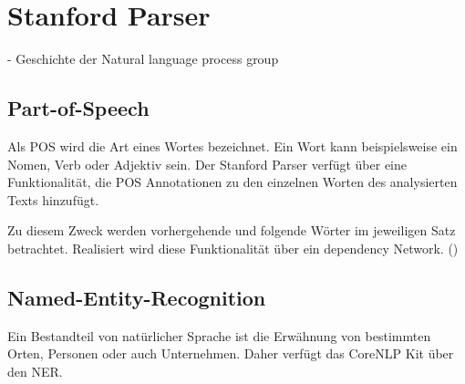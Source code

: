 \section{Stanford Parser}
- Geschichte der Natural language process group

\subsection{Part-of-Speech}
Als \ac{POS} wird die Art eines Wortes bezeichnet. Ein Wort kann beispielsweise ein Nomen, Verb oder Adjektiv sein. Der Stanford Parser verfügt über eine Funktionalität, die \ac{POS} Annotationen zu den einzelnen Worten des analysierten Texts hinzufügt.\par
Zu diesem Zweck werden vorhergehende und folgende Wörter im jeweiligen Satz betrachtet. Realisiert wird diese Funktionalität über ein dependency Network. (\cite[vgl.][1]{POSTAGGER})
\subsection{Named-Entity-Recognition}
Ein Bestandteil von natürlicher Sprache ist die Erwähnung von bestimmten Orten, Personen oder auch Unternehmen. Daher verfügt das CoreNLP Kit über den \ac{NER}. 